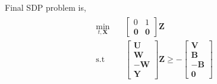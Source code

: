 \documentclass{article}
\begin{document}
Final SDP problem is,
\begin{gather*}
	\begin{aligned}
		\min _{t, \mathbf{X}} \quad & \begin{bmatrix}
		0 & 1\\
		\mathbf{0} & \mathbf{0}
		\end{bmatrix}\mathbf{Z}\\
		\textrm{s.t} \quad & \begin{bmatrix}
		\mathbf{U}\\
		\mathbf{W}\\
		-\mathbf{W}\\
		\mathbf{Y}
		\end{bmatrix}\mathbf{Z} \ge -\begin{bmatrix}
		\mathbf{V}\\
		\mathbf{B}\\
		-\mathbf{B}\\
		\mathbf{0}
		\end{bmatrix}
	\end{aligned}
\end{gather*}
\end{document}
